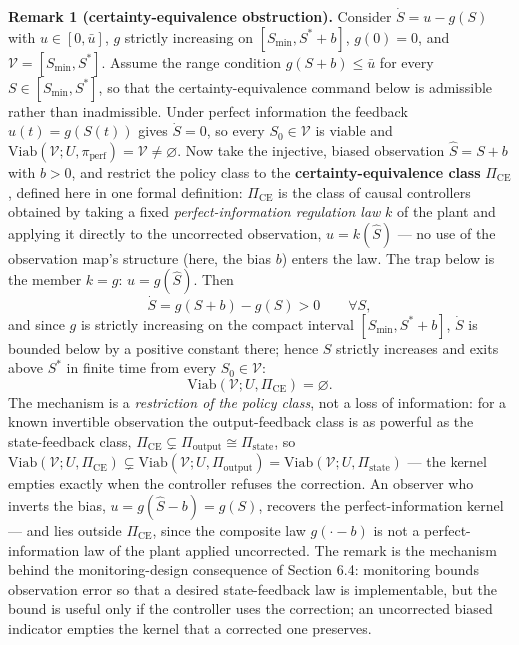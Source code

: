 \documentclass[11pt]{article}
\begin{document}
\textbf{Remark 1 (certainty-equivalence obstruction).} Consider
\(\dot S = u - g(S)\) with \(u \in [0, \bar u]\), \(g\) strictly
increasing on \([S_{\min}, S^* + b]\), \(g(0) = 0\), and
\(\mathcal{V} = [S_{\min}, S^*]\). Assume the range condition
\(g(S + b) \le \bar u\) for every \(S \in [S_{\min}, S^*]\), so that the
certainty-equivalence command below is admissible rather than
inadmissible. Under perfect information the feedback \(u(t) = g(S(t))\)
gives \(\dot S = 0\), so every \(S_0 \in \mathcal{V}\) is viable and
\(\mathrm{Viab}(\mathcal{V}; U, \pi_{\mathrm{perf}}) = \mathcal{V} \neq \varnothing\).
Now take the injective, biased observation \(\hat S = S + b\) with
\(b > 0\), and restrict the policy class to the
\textbf{certainty-equivalence class} \(\Pi_{\mathrm{CE}}\), defined here
in one formal definition: \(\Pi_{\mathrm{CE}}\) is the class of causal
controllers obtained by taking a fixed \emph{perfect-information
regulation law} \(k\) of the plant and applying it directly to the
uncorrected observation, \(u = k(\hat S)\) --- no use of the observation
map's structure (here, the bias \(b\)) enters the law. The trap below is
the member \(k = g\): \(u = g(\hat S)\). Then
\[\dot S = g(S + b) - g(S) > 0 \qquad \forall S,\] and since \(g\) is
strictly increasing on the compact interval \([S_{\min}, S^* + b]\),
\(\dot S\) is bounded below by a positive constant there; hence \(S\)
strictly increases and exits above \(S^*\) in finite time from every
\(S_0 \in \mathcal{V}\):
\[\mathrm{Viab}(\mathcal{V}; U, \Pi_{\mathrm{CE}}) = \varnothing.\] The
mechanism is a \emph{restriction of the policy class}, not a loss of
information: for a known invertible observation the output-feedback
class is as powerful as the state-feedback class,
\(\Pi_{\mathrm{CE}} \subsetneq \Pi_{\mathrm{output}} \cong \Pi_{\mathrm{state}}\),
so
\(\mathrm{Viab}(\mathcal{V}; U, \Pi_{\mathrm{CE}}) \subsetneq \mathrm{Viab}(\mathcal{V}; U, \Pi_{\mathrm{output}}) = \mathrm{Viab}(\mathcal{V}; U, \Pi_{\mathrm{state}})\)
--- the kernel empties exactly when the controller refuses the
correction. An observer who inverts the bias,
\(u = g(\hat S - b) = g(S)\), recovers the perfect-information kernel
--- and lies outside \(\Pi_{\mathrm{CE}}\), since the composite law
\(g(\cdot - b)\) is not a perfect-information law of the plant applied
uncorrected. The remark is the mechanism behind the monitoring-design
consequence of Section 6.4: monitoring bounds observation error so that
a desired state-feedback law is implementable, but the bound is useful
only if the controller uses the correction; an uncorrected biased
indicator empties the kernel that a corrected one preserves.
\end{document}

